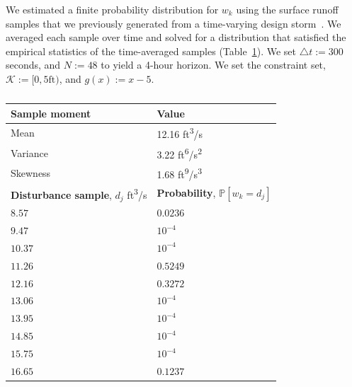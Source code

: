 \documentclass[letterpaper, 10 pt, conference]{ieeeconf}  %
\begin{document}
We estimated a finite probability distribution for $w_k$ using the surface runoff samples that we previously generated from a time-varying design storm~\cite{sustech}. 
We averaged each sample over time and solved for a distribution
that satisfied the empirical statistics of the time-averaged samples (Table~\ref{dist}). 
We set $\triangle t := 300$ seconds, and $N := 48$ to yield a 4-hour horizon.
We set the constraint set, $\mathcal{K} := [0, 5\text{ft})$, and $g(x) := x - 5$.

\begin{table}
\begin{center}
\caption{}
\begin{tabular}{| p{3.5cm} | p{3.5cm} |}
\hline
\bf{Sample moment} & \bf{Value}  \\ \hline
Mean & 12.16 ft\textsuperscript{3}/s \\ 
Variance & 3.22 ft\textsuperscript{6}/s\textsuperscript{2} \\ 
Skewness & 1.68 ft\textsuperscript{9}/s\textsuperscript{3} \\ 
\hline 
\textbf{Disturbance sample}, $d_j$ ft\textsuperscript{3}/s & \textbf{Probability}, $\mathbb{P}[w_k = d_j]$ \\ \hline
$8.57$ 		& $0.0236$ \\
$9.47$ 		& $10^{-4}$ \\
$10.37$ 		& $10^{-4}$ \\
$11.26$  & $0.5249$ \\ 
$12.16$ & $0.3272$ \\ 
$13.06$  & $10^{-4}$ \\ 
$13.95$  & $10^{-4}$ \\ 
$14.85$  & $10^{-4}$ \\ 
$15.75$  & $10^{-4}$ \\ 
$16.65$  & $0.1237$ \\ \hline
\end{tabular}
\begin{flushleft} \end{flushleft}
\label{dist}
\end{center}
\end{table}
\end{document}
